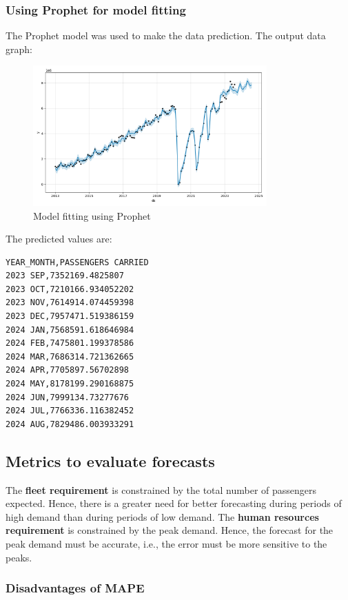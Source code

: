 \documentclass{article}
\begin{document}
\subsubsection{Using Prophet for model fitting}

The Prophet model was used to make the data prediction. The output data graph:
\begin{figure}[H]
  \centering
  \includegraphics[width=0.8\textwidth]{Prophet.png}
  \caption{Model fitting using Prophet}
\end{figure}
The predicted values are:
\begin{verbatim}
YEAR_MONTH,PASSENGERS CARRIED
2023 SEP,7352169.4825807
2023 OCT,7210166.934052202
2023 NOV,7614914.074459398
2023 DEC,7957471.519386159
2024 JAN,7568591.618646984
2024 FEB,7475801.199378586
2024 MAR,7686314.721362665
2024 APR,7705897.56702898
2024 MAY,8178199.290168875
2024 JUN,7999134.73277676
2024 JUL,7766336.116382452
2024 AUG,7829486.003933291
\end{verbatim}

\subsection{Metrics to evaluate forecasts}

The \textbf{fleet requirement} is constrained by the total number of passengers expected. Hence, there is a greater need for better forecasting during periods of high demand than during periods of low demand. The \textbf{human resources requirement} is constrained by the peak demand. Hence, the forecast for the peak demand must be accurate, i.e., the error must be more sensitive to the peaks.

\subsubsection*{Disadvantages of MAPE}
\end{document}
